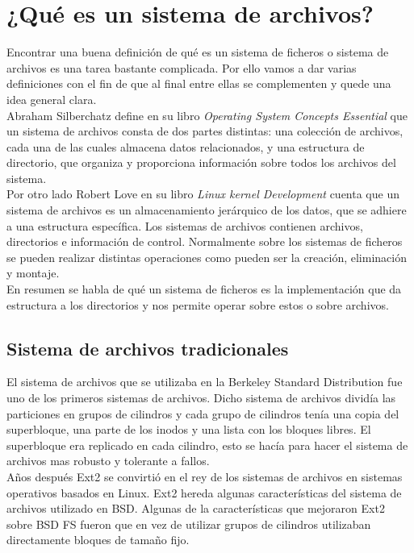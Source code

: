 \section{¿Qué es un sistema de archivos?}
Encontrar una buena definición de qué es un sistema de ficheros o sistema de archivos es una tarea bastante complicada. Por ello vamos a dar varias definiciones con el fin de que al final entre ellas se complementen y quede una idea general clara. \\

Abraham Silberchatz define en su libro \textit{Operating System Concepts Essential} \cite{silberchatz} que un sistema de archivos consta de dos partes distintas: una colección de archivos, cada una de las cuales almacena datos relacionados, y una estructura de directorio, que organiza y proporciona información sobre todos los archivos del sistema.\\

Por otro lado Robert Love en su libro \textit{Linux kernel Development} \cite{LinuxKernelDev} cuenta que un sistema de archivos es un almacenamiento jerárquico de los datos, que se adhiere a una estructura específica. Los sistemas de archivos contienen archivos, directorios e información de control. Normalmente sobre los sistemas de ficheros se pueden realizar distintas operaciones como pueden ser la creación, eliminación y montaje.\\

En resumen se habla de qué un sistema de ficheros es la implementación que da estructura a los directorios y nos permite operar sobre estos o sobre archivos.

\subsection{Sistema de archivos tradicionales}
El sistema de archivos que se utilizaba en la Berkeley Standard Distribution fue uno de los primeros sistemas de archivos. Dicho sistema de archivos dividía las particiones en grupos de cilindros y cada grupo de cilindros tenía una copia del superbloque, una parte de los inodos y una lista con los bloques libres. El superbloque era replicado en cada cilindro, esto se hacía para hacer el sistema de archivos mas robusto y tolerante a fallos. \cite{LinuxKernelDev} \\

Años después Ext2 se convirtió en el rey de los sistemas de archivos en sistemas operativos basados en Linux. Ext2 hereda algunas características del sistema de archivos utilizado en BSD. Algunas de la características que mejoraron Ext2 sobre BSD FS fueron que en vez de utilizar grupos de cilindros utilizaban directamente bloques de tamaño fijo.


